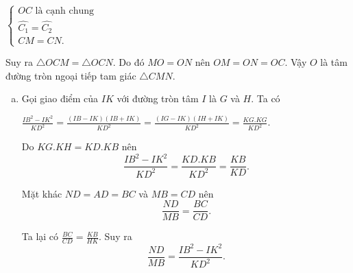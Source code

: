 \begin{ex}
{\begin{enumerate}
{    	$\begin{cases}
    	OC \text{ là cạnh chung } \\
    	\widehat{C_1}=\widehat{C_2} \\
    	CM=CN.
    	\end{cases}$    	
    }{
}
Suy ra $\triangle OCM = \triangle OCN$. Do đó $MO=ON$ nên $OM=ON=OC$. Vậy $O$ là tâm đường tròn ngoại tiếp tam giác $\triangle CMN$.
    \end{enumerate}
    	
	\begin{enumerate}[c)]
    	\item Gọi giao điểm của $IK$ với đường tròn tâm $I$ là $G$ và $H$. Ta có
    	
    	$\displaystyle \frac{IB^2-IK^2}{KD^2}=\frac{(IB-IK)(IB+IK)}{KD^2}=\frac{(IG-IK)(IH+IK)}{KD^2}=\frac{KG.KG}{KD^2}$.
    	
    	Do $KG.KH=KD.KB$ nên     	
    	$$\displaystyle \frac{IB^2-IK^2}{KD^2} = \frac{KD.KB}{KD^2}=\frac{KB}{KD}.$$
    	
    	Mặt khác $ND=AD=BC$ và $MB=CD$ nên
    	$$\displaystyle \frac{ND}{MB}= \frac{BC}{CD}.$$
    	
    	Ta lại có $\displaystyle \frac{BC}{CD}=\frac{KB}{HK}$. Suy ra
    	$$\frac{ND}{MB}=\frac{IB^2 -IK^2}{KD^2}.$$
    \end{enumerate}
}
\end{ex}

